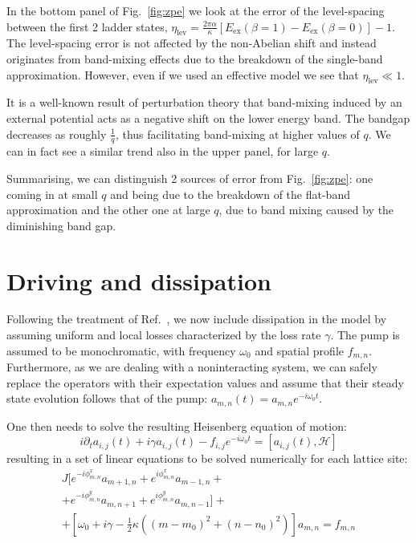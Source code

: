 \documentclass[twocolumn, 10pt, aps, superscriptaddress, floatfix, showpacs, pra, citeautoscript]{revtex4-1}
\begin{document}
In the bottom panel of Fig.~\ref{fig:zpe} we look at the error of the
level-spacing between the first 2 ladder states,
$\eta_{\text{lev}} = \frac{2\pi \alpha}{\kappa} [E_{\text{ex}}(\beta =
1) - E_{\text{ex}}(\beta = 0)] -1$.
The level-spacing error is not affected by the non-Abelian shift and
instead originates from band-mixing effects due to the breakdown of
the single-band approximation. However, even if we used an effective
model we see that $\eta_{\text{lev}} \ll 1$.

It is a well-known result of perturbation theory that band-mixing
induced by an external potential acts as a negative shift on the lower
energy band.  The bandgap decreases as roughly $\frac{1}{q}$, thus
facilitating band-mixing at higher values of $q$. We can in fact see a
similar trend also in the upper panel, for large $q$.

Summarising, we can distinguish 2 sources of error from
Fig.~\ref{fig:zpe}: one coming in at small $q$ and being due to the
breakdown of the flat-band approximation and the other one at large
$q$, due to band mixing caused by the diminishing band gap.




\section{Driving and dissipation}\label{sec:driven-dissipation}

Following the treatment of Ref.~, we now
include dissipation in the model by assuming uniform and local losses
characterized by the loss rate $\gamma$. The pump is assumed to be
monochromatic, with frequency $\omega_0$ and spatial profile
$f_{m,n}$.  Furthermore, as we are dealing with a noninteracting
system, we can safely replace the operators with their expectation
values and assume that their steady state evolution follows that of
the pump: $a_{m,n}(t) = a_{m,n} e^{-i \omega_0 t}$.

One then needs to solve the resulting Heisenberg equation of motion:
%
\begin{equation}
i\partial_{t}a_{i,j}(t)+i\gamma
a_{i,j}(t)-f_{i,j}e^{-i\omega_{0}t}=\left[a_{i,j}(t),\mathcal{H}\right]
\end{equation}
resulting in a set of linear equations to be solved numerically for each
lattice site:
%
\begin{multline}\label{eq:linear_problem}
J[e^{-i\phi_{m,n}^x}a_{m+1,n}+e^{i\phi_{m,n}^x}a_{m-1,n}+\\
+e^{-i\phi_{m,n}^y}a_{m,n+1}+e^{i\phi_{m,n}^y}a_{m,n-1}]+\\
+\left[\omega_{0}+i\gamma-\frac{1}{2}\kappa
\left((m-m_0)^{2}+(n-n_0)^{2}\right)\right]a_{m,n}=f_{m,n}
\end{multline}
\end{document}
